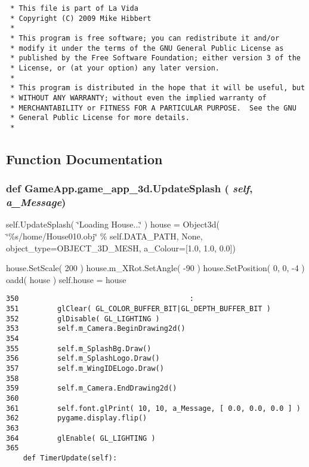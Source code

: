 \footnotesize\begin{verbatim}
 * This file is part of La Vida
 * Copyright (C) 2009 Mike Hibbert
 *
 * This program is free software; you can redistribute it and/or
 * modify it under the terms of the GNU General Public License as
 * published by the Free Software Foundation; either version 3 of the
 * License, or (at your option) any later version.
 *
 * This program is distributed in the hope that it will be useful, but
 * WITHOUT ANY WARRANTY; without even the implied warranty of
 * MERCHANTABILITY or FITNESS FOR A PARTICULAR PURPOSE.  See the GNU
 * General Public License for more details.
 *
\end{verbatim}
\normalsize
 

\subsection{Function Documentation}
\hypertarget{namespaceGameApp_1_1game__app__3d_4312b2008af9e7cc0986ea4ce9ad18c6}{
\subsubsection[UpdateSplash]{\setlength{\rightskip}{0pt plus 5cm}def GameApp.game\_\-app\_\-3d.UpdateSplash ( {\em self}, \/   {\em a\_\-Message})}}
\label{namespaceGameApp_1_1game__app__3d_4312b2008af9e7cc0986ea4ce9ad18c6}


self.UpdateSplash( \char`\"{}Loading House...\char`\"{} ) house = Object3d( \char`\"{}\%s/home/House010.obj\char`\"{} \% self.DATA\_\-PATH, None, object\_\-type=OBJECT\_\-3D\_\-MESH, a\_\-Colour=\mbox{[}1.0, 1.0, 0.0\mbox{]}) 

house.SetScale( 200 ) house.m\_\-XRot.SetAngle( -90 ) house.SetPosition( 0, 0, -4 ) oadd( house ) self.house = house 

\begin{Code}\begin{verbatim}350                                        :
351         glClear( GL_COLOR_BUFFER_BIT|GL_DEPTH_BUFFER_BIT )
352         glDisable( GL_LIGHTING )
353         self.m_Camera.BeginDrawing2d()
354         
355         self.m_SplashBg.Draw()
356         self.m_SplashLogo.Draw()
357         self.m_WingIDELogo.Draw()
358         
359         self.m_Camera.EndDrawing2d()
360         
361         self.font.glPrint( 10, 10, a_Message, [ 0.0, 0.0, 0.0 ] )
362         pygame.display.flip()
363         
364         glEnable( GL_LIGHTING )
365 
    def TimerUpdate(self):
\end{verbatim}
\end{Code}




